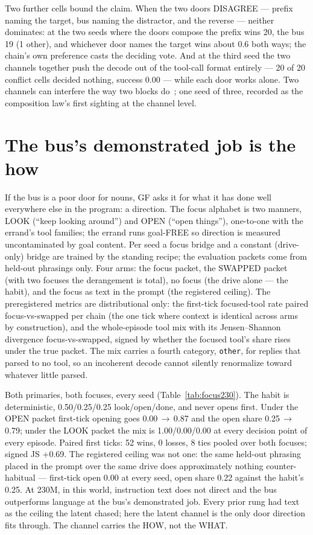 \documentclass[11pt]{article}
\begin{document}
Two further cells bound the claim. When the two doors DISAGREE ---
prefix naming the target, bus naming the distractor, and the reverse
--- neither dominates: at the two seeds where the doors compose the
prefix wins 20, the bus 19
(1 other), and whichever door names the target wins
about 0.6 both ways; the chain's own preference casts the deciding
vote. And at the third seed the two channels together push the decode
out of the tool-call format entirely --- 20
of 20 conflict cells decided nothing, success 0.00 --- while each door
works alone. Two channels can interfere the way two blocks
do~\cite{penov2026onestage}; one seed of three, recorded as the
composition law's first sighting at the channel level.

\section{The bus's demonstrated job is the how}

If the bus is a poor door for nouns, GF asks it for what it has done
well everywhere else in the program: a direction. The focus alphabet is
two manners, LOOK (``keep looking around'') and OPEN (``open things''),
one-to-one with the errand's tool families; the errand runs
goal-FREE so direction is measured uncontaminated by goal content.
Per seed a focus bridge and a constant (drive-only) bridge are trained
by the standing recipe; the evaluation packets come from held-out
phrasings only. Four arms: the focus packet, the SWAPPED packet (with
two focuses the derangement is total), no focus (the drive alone ---
the habit), and the focus as text in the prompt (the registered
ceiling). The preregistered metrics are distributional only: the
first-tick focused-tool rate paired focus-vs-swapped per chain (the
one tick where context is identical across arms by construction), and
the whole-episode tool mix with its Jensen--Shannon divergence
focus-vs-swapped, signed by whether the focused tool's share rises
under the true packet. The mix carries a fourth category,
\texttt{other}, for replies that parsed to no tool, so an
incoherent decode cannot silently renormalize toward whatever little
parsed.

Both primaries, both focuses, every seed (Table~\ref{tab:focus230}).
The habit is deterministic, 0.50/0.25/0.25
look/open/done, and never opens first. Under the OPEN packet first-tick
opening goes 0.00\,$\to$\,0.87
and the open share 0.25\,$\to$\,0.79;
under the LOOK packet the mix is 1.00/0.00/0.00 at every decision
point of every episode. Paired first ticks: 52 wins, 0 losses,
8 ties pooled over both focuses; signed JS +0.69.
The registered ceiling was not one: the same held-out phrasing placed
in the prompt over the same drive does approximately nothing
counter-habitual --- first-tick open 0.00
at every seed, open share 0.22 against
the habit's 0.25. At 230M, in this world,
instruction text does not direct and the bus outperforms language at
the bus's demonstrated job. Every prior rung had text as the ceiling
the latent chased; here the latent channel is the only door direction
fits through. The channel carries the HOW, not the WHAT.
\end{document}
